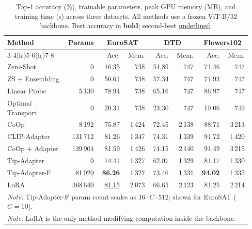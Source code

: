 \documentclass[10pt,twocolumn,letterpaper]{article}
\begin{document}
\begin{table}[t]
\centering
\caption{Top-1 accuracy (\%), trainable parameters, peak GPU memory (MB), and training time (s) across three datasets.  All methods use a frozen ViT-B/32 backbone. Best accuracy in \textbf{bold}; second-best \underline{underlined}.}

\label{tab:main}
\small
\begin{tabular}{@{}lrrrrrrr@{}}
\toprule
\multirow{2}{*}{\textbf{Method}} &
\multirow{2}{*}{\textbf{Params}} &
\multicolumn{2}{c}{\textbf{EuroSAT}} &
\multicolumn{2}{c}{\textbf{DTD}} &
\multicolumn{2}{c}{\textbf{Flowers102}} \\
\cmidrule(lr){3-4}\cmidrule(lr){5-6}\cmidrule(lr){7-8}
& & Acc. & Mem. & Acc. & Mem. & Acc. & Mem. \\
\midrule
Zero-Shot           & 0       & 46.35 & 738  & 54.89 & 747  & 71.46 & 747  \\
ZS + Ensembling     & 0       & 50.61 & 738  & 57.34 & 747  & 71.93 & 747  \\
Linear Probe        & 5\,130  & 78.94 & 738  & 65.16 & 747  & 86.97 & 747  \\
Optimal Transport   & 0       & 20.31 & 738  & 23.30 & 747  & 19.06 & 749  \\
\midrule
CoOp                & 8\,192  & 75.87 & 1\,424  & 72.45 & 2\,138  & 88.71 & 3\,213  \\
CLIP-Adapter        & 131\,712 & 81.26 & 1\,347  & 74.31 & 1\,339  & 91.72 & 1\,420  \\
CoOp + Adapter      & 139\,904 & 81.59 & 1\,426  & 74.15 & 2\,140  & 91.49 & 3\,215  \\
\midrule
Tip-Adapter         & 0       & 74.41 & 1\,327  & 62.07 & 1\,329  & 81.17 & 1\,330  \\
Tip-Adapter-F       & 81\,920 & \textbf{86.26} & 1\,327  & \underline{73.46} & 1\,331  & \textbf{94.02} & 1\,332  \\
LoRA                & 368\,640 & \underline{81.15} & 2\,073  & 66.65 & 2\,123  & 81.25 & 2\,214  \\
\midrule
\multicolumn{8}{l}{\footnotesize \textit{Note:} Tip-Adapter-F param count scales as $16 \cdot C \cdot 512$; shown for EuroSAT ($C{=}10$).}\\
\multicolumn{8}{l}{\footnotesize \textit{Note:} LoRA is the only method modifying computation inside the backbone.}\\
\bottomrule
\end{tabular}
\end{table}
\end{document}
